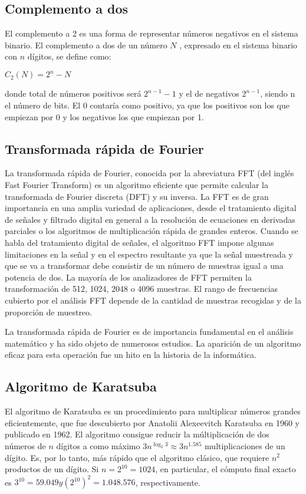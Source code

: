 \subsection{Complemento a dos}
El complemento a 2 es una forma de representar números negativos en el sistema binario. El complemento a dos de un número $N$ , expresado en el sistema binario con $n$ dígitos, se define como:

$ C_2(N)=2^n -N $

donde total de números positivos será $2^{n-1}-1$  y el de negativos $2^{n-1}$, siendo n el número de bits. El 0 contaría como positivo, ya que los positivos son los que empiezan por 0 y los negativos los que empiezan por 1.

\subsection{Transformada rápida de Fourier}

La transformada rápida de Fourier, conocida por la abreviatura FFT (del inglés Fast Fourier Transform) es un algoritmo eficiente que permite calcular la transformada de Fourier discreta (DFT) y su inversa. La FFT es de gran importancia en una amplia variedad de aplicaciones, desde el tratamiento digital de señales y filtrado digital en general a la resolución de ecuaciones en derivadas parciales o los algoritmos de multiplicación rápida de grandes enteros. Cuando se habla del tratamiento digital de señales, el algoritmo FFT impone algunas limitaciones en la señal y en el espectro resultante ya que la señal muestreada y que se va a transformar debe consistir de un número de muestras igual a una potencia de dos. La mayoría de los analizadores de FFT permiten la transformación de 512, 1024, 2048 o 4096 muestras. El rango de frecuencias cubierto por el análisis FFT depende de la cantidad de muestras recogidas y de la proporción de muestreo.

La transformada rápida de Fourier es de importancia fundamental en el análisis matemático y ha sido objeto de numerosos estudios. La aparición de un algoritmo eficaz para esta operación fue un hito en la historia de la informática. 

\subsection{Algoritmo de Karatsuba}

El algoritmo de Karatsuba es un procedimiento para multiplicar números grandes eficientemente, que fue descubierto por Anatolii 
Alexeevitch Karatsuba en 1960 y publicado en 1962. El algoritmo consigue reducir la múltiplicación de dos números de $n$ dígitos a 
como máximo $3n^{\log _{2}3}\approx 3n^{1.585}$  multiplicaciones de un dígito. Es, por lo tanto, más rápido que el algoritmo clásico, 
que requiere $n^2$ productos de un dígito. Si $n = 2^10 = 1024$, en particular, el cómputo final exacto es $3^10 = 59.049 y (2^10)^2 = 
1.048.576$, respectivamente. 

